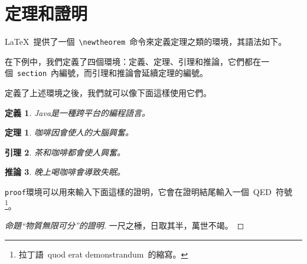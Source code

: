 \section{定理和證明}
\LaTeX~提供了一個~\verb|\newtheorem|~命令來定義定理之類的環境，其語法如下。
\begin{code}
\newtheorem{環境名}[編號延續]{顯示名}[編號層次]
\end{code}

在下例中，我們定義了四個環境：定義、定理、引理和推論，它們都在一個~\verb|section|~內編號，而引理和推論會延續定理的編號。
\begin{code}
\newtheorem{defination}{定義}[section]
\newtheorem{theorem}{定理}[section]
\newtheorem{lemma}[theorem]{引理}
\newtheorem{corollary}[theorem]{推論}
\end{code}

\newtheorem{defination}{定義}[section]
\newtheorem{theorem}{定理}[section]
\newtheorem{lemma}[theorem]{引理}
\newtheorem{corollary}[theorem]{推論}

定義了上述環境之後，我們就可以像下面這樣使用它們。
\begin{demo}
\begin{defination}
Java是一種跨平台的編程語言。
\end{defination}
\end{demo}

\begin{demo}
\begin{theorem}
咖啡因會使人的大腦興奮。
\end{theorem}
\end{demo}

\begin{demo}
\begin{lemma}
茶和咖啡都會使人興奮。
\end{lemma}
\end{demo}

\begin{demo}
\begin{corollary}
晚上喝咖啡會導致失眠。
\end{corollary}
\end{demo}

\verb|proof|環境可以用來輸入下面這樣的證明，它會在證明結尾輸入一個~QED~符號\footnote{拉丁語~quod erat demonstrandum~的縮寫。}。

\begin{demo}
\begin{proof}[命題``物質無限可分''的證明]
一尺之棰，日取其半，萬世不竭。
\end{proof}
\end{demo}

